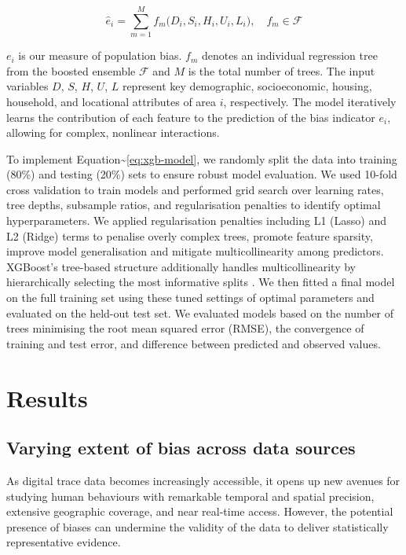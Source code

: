 \documentclass[]{rsos}%
\begin{document}
\begin{equation} \label{eq:xgb-model}
\widehat{e}_i 
= \sum_{m=1}^M f_m\bigl(D_i, S_i, H_i, U_i, L_i\bigr),
\quad f_m \in \mathcal{F}
\end{equation}

\(e_i\) is our measure of population bias. \(f_m\) denotes an individual
regression tree from the boosted ensemble \(\mathcal{F}\) and \(M\) is the
total number of trees. The input variables \(D\), \(S\), \(H\), \(U\), \(L\)
represent key demographic, socioeconomic, housing, household, and
locational attributes of area \(i\), respectively. The model iteratively
learns the contribution of each feature to the prediction of the bias
indicator \(e_i\), allowing for complex, nonlinear interactions.

To implement Equation\textasciitilde{}\ref{eq:xgb-model}, we randomly split the data
into training (80\%) and testing (20\%) sets to ensure robust model
evaluation. We used 10-fold cross validation to train models and
performed grid search over learning rates, tree depths, subsample
ratios, and regularisation penalties to identify optimal
hyperparameters. We applied regularisation penalties including L1
(Lasso) and L2 (Ridge) terms to penalise overly complex trees, promote
feature sparsity, improve model generalisation and mitigate
multicollinearity among predictors. XGBoost's tree-based structure
additionally handles multicollinearity by hierarchically selecting the
most informative splits \citep{chen2016}. We then fitted a final model on the
full training set using these tuned settings of optimal parameters and
evaluated on the held-out test set. We evaluated models based on the
number of trees minimising the root mean squared error (RMSE), the
convergence of training and test error, and difference between predicted
and observed values.

\section{Results}\label{results}

\subsection{Varying extent of bias across data sources}\label{varying-extent-of-bias-across-data-sources}

As digital trace data becomes increasingly accessible, it opens up new
avenues for studying human behaviours with remarkable temporal and
spatial precision, extensive geographic coverage, and near real-time
access. However, the potential presence of biases can undermine the
validity of the data to deliver statistically representative evidence.
\end{document}
